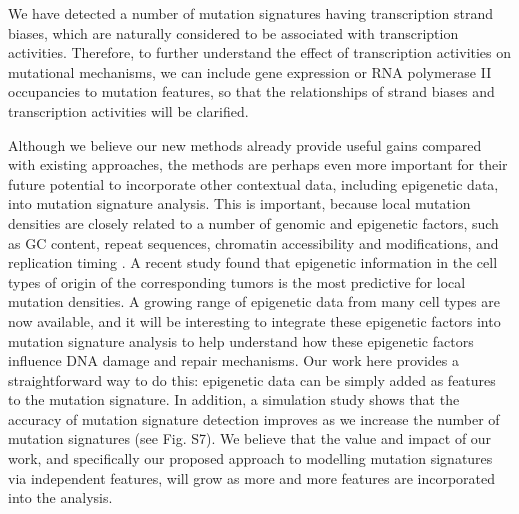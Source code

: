 \documentclass[10pt,letterpaper]{article}
\begin{document}
We have detected a number of mutation signatures having transcription strand biases, 
which are naturally considered to be associated with transcription activities.
Therefore, to further understand the effect of transcription activities on mutational mechanisms, 
we can include gene expression or RNA polymerase II occupancies to mutation features, 
so that the relationships of strand biases and transcription activities will be clarified.


Although we believe our new methods already provide useful gains compared with existing approaches,
the methods are perhaps even more important for their future potential to incorporate other contextual data, including epigenetic data, into mutation signature analysis. 
This is important, because local mutation densities are closely related to a number of genomic and epigenetic factors, 
such as GC content, repeat sequences, chromatin accessibility and modifications, and replication timing \cite{pmid22820252, pmid21953857, pmid23422670, pmid23770567}.
A recent study found that epigenetic information in the cell types of origin of the corresponding tumors is the most predictive \cite{pmid25693567} for local mutation densities. 
A growing range of epigenetic data from many cell types are now available, 
and it will be interesting to integrate these epigenetic factors into mutation signature analysis to help understand how these epigenetic factors influence DNA damage and repair mechanisms. 
Our work here provides a straightforward way to do this: epigenetic data can be simply added as features to the mutation signature.
In addition, a simulation study shows that the accuracy of mutation signature detection improves as we increase the number of mutation signatures (see Fig. S7).
We believe that the value and impact of our work, and specifically our proposed approach to modelling mutation signatures via independent features, will grow as more and more features
are incorporated into the analysis.







\end{document}
